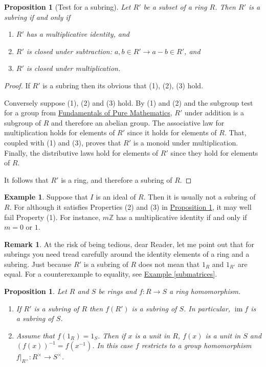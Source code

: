 \documentclass[11pt]{amsbook}
\DeclareMathOperator{\im}{\mathrm{im}}
\newtheorem{proposition}[theorem]{Proposition}
\theoremstyle{definition}
\newtheorem{rem}[theorem]{Remark}
\newtheorem{ex}[theorem]{Example}
\begin{document}
\begin{proposition}[Test for a subring] \label{testforsubring}Let $R'$ be a subset of a ring $R$. Then $R'$ is a subring if and only if
\begin{enumerate}
\item $R'$ has a multiplicative identity, and
 \item $R'$ is closed under
subtraction:  $a,b\in R' \to a-b \in R'$, and
\item $R'$ is
closed under multiplication.
\end{enumerate}
\end{proposition}
\begin{proof} If $R'$ is a subring then its obvious that (1), (2), (3) hold.

Conversely suppose (1), (2) and (3) hold. By (1) and (2) and the
subgroup test for a group from \href{http://www.drps.ed.ac.uk/12-13/dpt/cxmath08064.htm}{Fundamentals of Pure Mathematics}, $R'$ under
addition is a subgroup of $R$ and therefore an abelian group. The
associative law for multiplication holds for elements of $R'$ since
it holds for elements of $R$. That, coupled with (1) and (3),
proves that $R'$ is a monoid under multiplication.  Finally, the distributive laws hold for elements of $R'$ since they hold for elements of $R$.

It follows that $R'$ is a ring, and therefore a subring of $R$.
\end{proof}

 \begin{ex}
Suppose that $I$ is an ideal of $R$. Then it is usually not a subring of $R$. For although it  satisfies Properties (2) and (3) in \hyperref[testforsubring]{Proposition \ref{testforsubring}}, it may well fail Property (1). For instance, $m\mathbb{Z}$ has a multiplicative identity if and only if $m = 0$ or $1$.
\end{ex}

\begin{rem} At the risk of being tedious, dear Reader, let me point out that for subrings you need tread carefully around the identity elements of a ring and a subring. Just because $R'$ is a subring of $R$ does not mean that $1_R$ and $1_{R'}$ are equal. For a counterexample to equality, see \hyperref[submatrices]{Example \ref{submatrices}}.
\end{rem}

\begin{proposition}\label{imring}
Let $R$ and $S$ be rings and $f : R\longrightarrow S$ a ring homomorphism.
\begin{enumerate}
\item If $R'$ is a subring of $R$ then $f (R')$ is a subring of $S$. In particular, $\im f$ is a subring of $S$.
\item Assume that $f (1_R) = 1_S$. Then if $x$ is a unit in $R$, $f (x)$ is a unit in $S$ and $(f(x))^{-1} = f(x^{-1})$. In this case $f$ restricts to a group homomorphism $f|_{R^{\times}} : R^{\times} \to S^{\times}$.
\end{enumerate}
\end{proposition}
\end{document}
